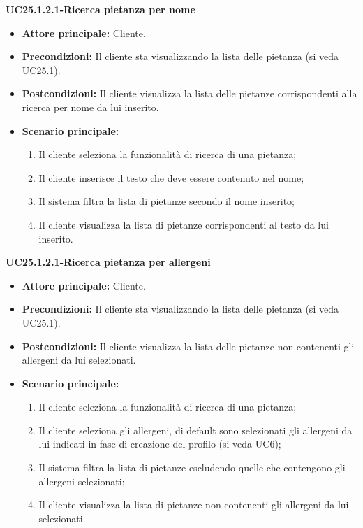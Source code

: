 \textbf{UC25.1.2.1-Ricerca pietanza per nome}
\begin{itemize}
\item \textbf{Attore principale:} Cliente.
\item \textbf{Precondizioni:}  Il cliente sta visualizzando la lista delle pietanza (si veda UC25.1).
\item \textbf{Postcondizioni:} Il cliente visualizza la lista delle pietanze corrispondenti alla ricerca per nome da lui inserito.
\item \textbf{Scenario principale:}
\begin{enumerate}
    \item Il cliente seleziona la funzionalità di ricerca di una pietanza;
    \item Il cliente inserisce il testo che deve essere contenuto nel nome;
    \item Il sistema filtra la lista di pietanze secondo il nome inserito;
    \item Il cliente visualizza la lista di pietanze corrispondenti al testo da lui inserito.
\end{enumerate}
\end{itemize}

\textbf{UC25.1.2.1-Ricerca pietanza per allergeni}
\begin{itemize}
\item \textbf{Attore principale:} Cliente.
\item \textbf{Precondizioni:}  Il cliente sta visualizzando la lista delle pietanza (si veda UC25.1).
\item \textbf{Postcondizioni:} Il cliente visualizza la lista delle pietanze non contenenti gli allergeni da lui selezionati.
\item \textbf{Scenario principale:}
\begin{enumerate}
    \item Il cliente seleziona la funzionalità di ricerca di una pietanza;
    \item Il cliente seleziona gli allergeni, di default sono selezionati gli allergeni da lui indicati in fase di creazione del profilo (si veda UC6);
    \item Il sistema filtra la lista di pietanze escludendo quelle che contengono gli allergeni selezionati;
    \item Il cliente visualizza la lista di pietanze non contenenti gli allergeni da lui selezionati.
\end{enumerate}
\end{itemize}

